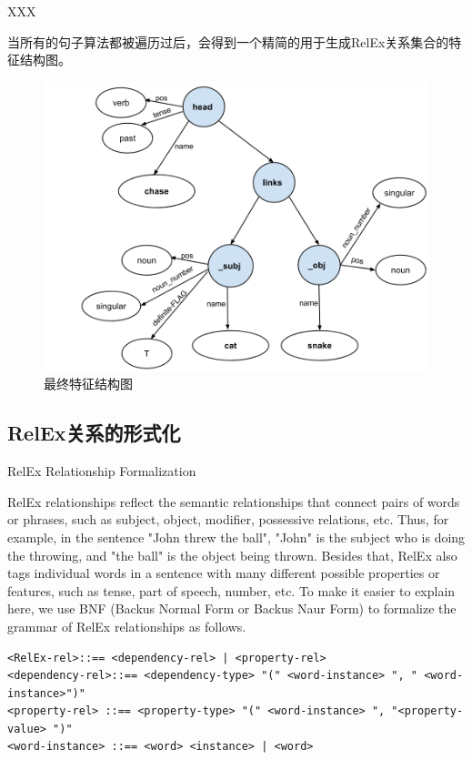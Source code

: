XXX

当所有的句子算法都被遍历过后，会得到一个精简的用于生成RelEx关系集合的特征结构图。

\begin{figure}
\begin{centering}
\includegraphics[width=12cm]{figures/finalFeatureStructure.png} 
\par\end{centering}

\caption{最终特征结构图\label{fig:finalFeatureStructure}}


\end{figure}

\subsection{RelEx关系的形式化}{RelEx Relationship Formalization}

RelEx relationships reflect the semantic relationships that connect pairs of words or phrases, such as subject, object, modifier, possessive relations, etc. Thus, for example, in the sentence "John threw the ball", "John" is the subject who is doing the throwing, and "the ball" is the object being thrown. Besides that, RelEx also tags individual words in a sentence with many different possible properties or features, such as tense, part of speech, number, etc. To make it easier to explain here, we use BNF (Backus Normal Form or Backus Naur Form)  to formalize the grammar of RelEx relationships as follows. 

 {\tt\begin{scriptsize}\begin{lstlisting}
<RelEx-rel>::== <dependency-rel> | <property-rel>
<dependency-rel>::== <dependency-type> "(" <word-instance> ", " <word-instance>")"
<property-rel> ::== <property-type> "(" <word-instance> ", "<property-value> ")"
<word-instance> ::== <word> <instance> | <word>
  \end{lstlisting}\end{scriptsize}}

